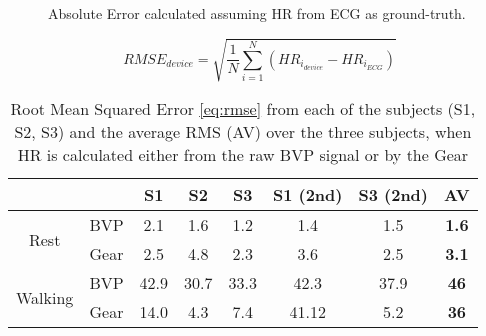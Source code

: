 \begin{figure}[!h]
	\centering
	\\
	\\	
	\caption{Absolute Error calculated assuming HR from ECG as ground-truth.}
	\label{fig:walking2}
\end{figure}

\begin{equation}
	RMSE_{device}= \sqrt{\frac{1}{N}\sum\limits_{i=1}^N{(HR_{i_{device}}-HR_{i_{ECG}})}}
	\label{eq:rmse}
\end{equation}

\begin{table}[h]
	\centering
	\caption{Root Mean Squared Error \cref{eq:rmse} from each of the subjects (S1, S2, S3) and the average RMS (AV) over the three subjects, when HR is calculated either from the raw BVP signal or by the Gear}
	\label{table:error}
	\begin{tabular}{cc|c|c|c|c|c|c|}
		\cline{3-8}
		&      & S1    & S2    & S3  & S1 (2nd)  & S3 (2nd) & \textbf{AV}    \\ \hline
		\multicolumn{1}{|c|}{\multirow{2}{*}{Rest}} & BVP  & 2.1   & 1.6  & 1.2   & 1.4  & 1.5   & \textbf{1.6}  \\ \cline{2-8} 
		\multicolumn{1}{|c|}{}                      & Gear & 2.5  & 4.8  & 2.3   & 3.6  & 2.5  & \textbf{3.1}  \\ \hline
		\multicolumn{1}{|c|}{\multirow{2}{*}{Walking}} & BVP  & 42.9 & 30.7 & 33.3  & 42.3  & 37.9  & \textbf{46} \\ \cline{2-8} 
		\multicolumn{1}{|c|}{}                      & Gear & 14.0 & 4.3  & 7.4  & 41.12  &  5.2  & \textbf{36}  \\ \hline
	\end{tabular}
\end{table}

